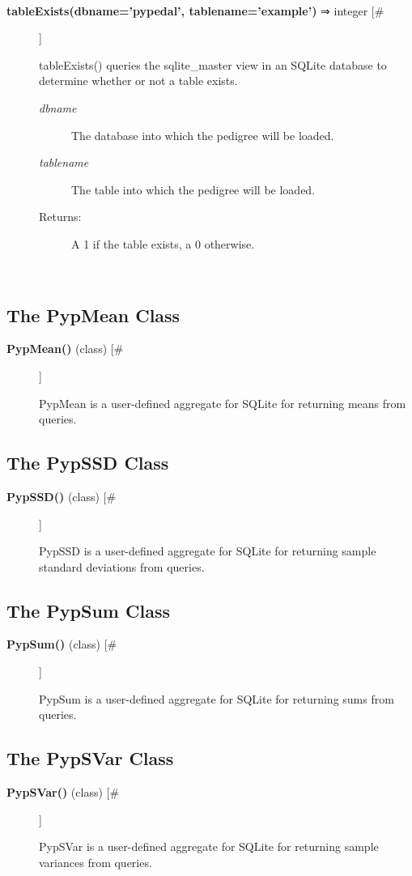\begin{description}
\begin{description}
\end{description}
\\ 

\item[\textbf{tableExists(dbname='pypedal', tablename='example')}
 ⇒ integer [\#]]

 tableExists() queries the sqlite\_master view in an SQLite database to determine whether or not a table exists.
\begin{description}
\item[\emph{dbname}
] The database into which the pedigree will be loaded.
\item[\emph{tablename}
] The table into which the pedigree will be loaded.
\item[Returns:] A 1 if the table exists, a 0 otherwise.

\end{description}
\\ 


\end{description}
\subsection*{The PypMean Class}
\begin{description}
\item[\textbf{PypMean()}
 (class) [\#]]

 PypMean is a user-defined aggregate for SQLite for returning means from queries.


\end{description}
\subsection*{The PypSSD Class}
\begin{description}
\item[\textbf{PypSSD()}
 (class) [\#]]

 PypSSD is a user-defined aggregate for SQLite for returning sample standard deviations from queries.


\end{description}
\subsection*{The PypSum Class}
\begin{description}
\item[\textbf{PypSum()}
 (class) [\#]]

 PypSum is a user-defined aggregate for SQLite for returning sums from queries.


\end{description}
\subsection*{The PypSVar Class}
\begin{description}
\item[\textbf{PypSVar()}
 (class) [\#]]

 PypSVar is a user-defined aggregate for SQLite for returning sample variances from queries.


\end{description}

